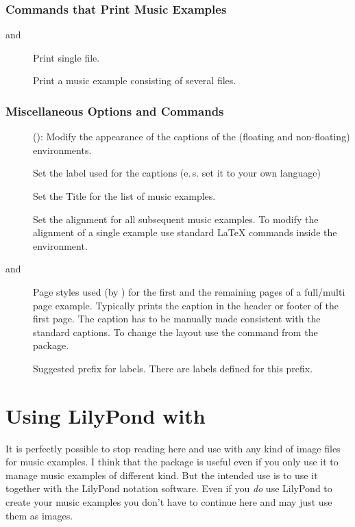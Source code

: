 \documentclass[../openLilyLib]{subfiles}
\begin{document}
\subsubsection*{Commands that Print Music Examples}
\begin{description}
\item[ and ]Print single file.
\item[]Print a music example consisting of several files.
\end{description}

\subsubsection*{Miscellaneous Options and Commands}
\begin{description}
\item[](): Modify the appearance of the captions of the (floating and non-floating) environments.
\item[]Set the label used for the captions (e.\,s. set it to your own language)
\item[]Set the Title for the list of music examples.
\item[] Set the alignment for all subsequent music examples.
To modify the alignment of a single example use standard \LaTeX{} commands inside the environment.
\item[ and ]Page styles used (by ) for the first and the remaining pages of a full/multi page example. 
Typically prints the caption in the header or footer of the first page.
The caption has to be manually made consistent with the standard captions.
To change the layout use the  command from the  package.
\item[] Suggested prefix for labels.
There are  labels defined for this prefix.
\end{description} 

\section{Using LilyPond with }
\label{sec:xmp_lilypond-configuration}
It is perfectly possible to stop reading here and use  with any kind of image files for music examples.
I think that the package is useful even if you only use it to manage music examples of different kind.
But the intended use is to use it together with the LilyPond notation software.
Even if you \emph{do} use LilyPond to create your music examples you don't have to continue here and may just use them as images.
\end{document}
